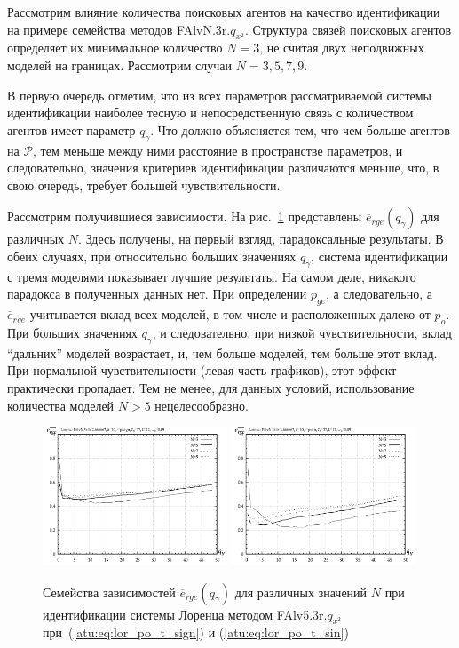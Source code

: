 Рассмотрим влияние количества поисковых агентов
на качество идентификации на примере семейства методов FAlvN.3r.$q_{x^2}$.
Структура связей поисковых агентов определяет их минимальное количество $N=3$,
не считая двух неподвижных моделей на границах.
Рассмотрим случаи $N=3,5,7,9$.

В первую очередь отметим,
что из всех параметров рассматриваемой системы идентификации
наиболее тесную и непосредственную связь с количеством
агентов имеет параметр $q_\gamma$. Что должно объясняется тем, что чем больше
агентов на $\mathcal{P}$, тем меньше между ними расстояние в пространстве параметров,
и следовательно, значения критериев идентификации различаются меньше,
что, в свою очередь, требует большей чувствительности.

Рассмотрим получившиеся зависимости.
На рис.~\ref{atu:f:lor_N_rge} представлены $\overline{e}_{rge}(q_\gamma)$
для различных $N$. Здесь получены, на первый взгляд, парадоксальные результаты.
В обеих случаях, при относительно больших значениях $q_\gamma$,
система идентификации с тремя моделями показывает лучшие результаты.
На самом деле, никакого парадокса в полученных данных нет.
При определении $p_{ge}$, а следовательно, а $\overline{e}_{rge}$
учитывается вклад всех моделей, в том числе и расположенных далеко от $p_o$.
При больших значениях $q_\gamma$, и следовательно, при низкой чувствительности,
вклад ``дальних'' моделей возрастает, и, чем больше моделей,
тем больше этот вклад. При нормальной чувствительности (левая часть графиков),
этот эффект практически пропадает. Тем не менее, для данных условий,
использование количества моделей $N>5$ нецелесообразно.



\begin{figure}[h!]
  \centerline{
    \includegraphics[width=0.49\textwidth]{p/cha/lor/FAlv5.3z/N/lor_FAlvN_3z_qx2_p_qg_e_rge_sign.png}
    \hfill
    \includegraphics[width=0.49\textwidth]{p/cha/lor/FAlv5.3z/N/lor_FAlvN_3z_qx2_p_qg_e_rge_sin.png}
  }
  \caption{Семейства зависимостей $\overline{e}_{rge}(q_\gamma)$ для различных значений $N$ при идентификации системы Лоренца методом FAlv5.3r.$q_{x^2}$
   при~(\ref{atu:eq:lor_po_t_sign}) и (\ref{atu:eq:lor_po_t_sin})}
  \label{atu:f:lor_N_rge}
\end{figure}


